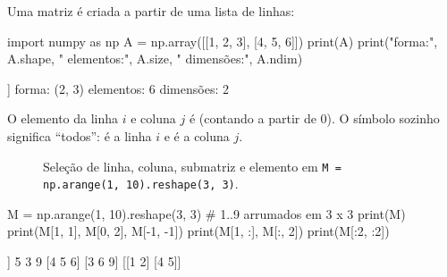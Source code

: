 Uma matriz é criada a partir de uma lista de linhas:

\begin{entrada}
import numpy as np
A = np.array([[1, 2, 3],
              [4, 5, 6]])
print(A)
print("forma:", A.shape, " elementos:", A.size, " dimensões:", A.ndim)
\end{entrada}
\begin{saida}
[[1 2 3]
 [4 5 6]]
forma: (2, 3)  elementos: 6  dimensões: 2
\end{saida}

O elemento da linha $i$ e coluna $j$ é  (contando a partir de 0). O símbolo \py{:} sozinho
significa ``todos'':  é a linha $i$ e  é a coluna $j$.

\begin{figure}[ht]
\centering
{}
\caption{Seleção de linha, coluna, submatriz e elemento em \texttt{M = np.arange(1, 10).reshape(3, 3)}.}
\label{fig:fatias-matriz}
\end{figure}

\begin{entrada}
M = np.arange(1, 10).reshape(3, 3)   # 1..9 arrumados em 3 x 3
print(M)
print(M[1, 1], M[0, 2], M[-1, -1])
print(M[1, :], M[:, 2])
print(M[:2, :2])
\end{entrada}
\begin{saida}
[[1 2 3]
 [4 5 6]
 [7 8 9]]
5 3 9
[4 5 6] [3 6 9]
[[1 2]
 [4 5]]
\end{saida}

